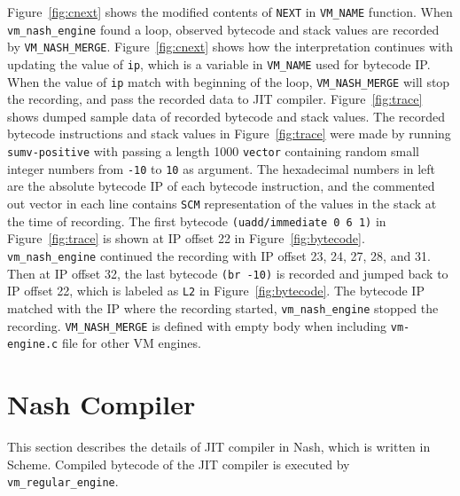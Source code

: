 \documentclass[preprint, 10pt]{sigplanconf}
\begin{document}
Figure~\hyperref[fig:cnext]{\ref{fig:cnext}} shows the modified contents of
\texttt{NEXT} in \texttt{VM\_NAME} function. When \texttt{vm\_nash\_engine}
found a loop, observed bytecode and stack values are recorded by
\texttt{VM\_NASH\_MERGE}. Figure~\hyperref[fig:cnext]{\ref{fig:cnext}} shows
how the interpretation continues with updating the value of \texttt{ip}, which
is a variable in \texttt{VM\_NAME} used for bytecode IP. When the value of
\texttt{ip} match with beginning of the loop, \texttt{VM\_NASH\_MERGE} will
stop the recording, and pass the recorded data to JIT
compiler. Figure~\hyperref[fig:trace]{\ref{fig:trace}} shows dumped sample
data of recorded bytecode and stack values.  The recorded bytecode
instructions and stack values in Figure~\hyperref[fig:trace]{\ref{fig:trace}}
were made by running \texttt{sumv-positive} with passing a length 1000
\texttt{vector} containing random small integer numbers from \texttt{-10} to
\texttt{10} as argument. The hexadecimal numbers in left are the absolute
bytecode IP of each bytecode instruction, and the commented out vector in each
line contains \texttt{SCM} representation of the values in the stack at the
time of recording.  The first bytecode \texttt{(uadd/immediate 0 6 1)} in
Figure~\hyperref[fig:trace]{\ref{fig:trace}} is shown at IP offset 22 in
Figure~\hyperref[fig:bytecode]{\ref{fig:bytecode}}. \texttt{vm\_nash\_engine}
continued the recording with IP offset 23, 24, 27, 28, and 31. Then at IP
offset 32, the last bytecode \texttt{(br -10)} is recorded and jumped back to
IP offset 22, which is labeled as \texttt{L2} in
Figure~\hyperref[fig:bytecode]{\ref{fig:bytecode}}. The bytecode IP matched
with the IP where the recording started, \texttt{vm\_nash\_engine} stopped the
recording. \texttt{VM\_NASH\_MERGE} is defined with empty body when including
\texttt{vm-engine.c} file for other VM engines.

\section{Nash Compiler}
\label{sec:compiler}

This section describes the details of JIT compiler in Nash, which is written
in Scheme. Compiled bytecode of the JIT compiler is executed by
\texttt{vm\_regular\_engine}.
\end{document}
